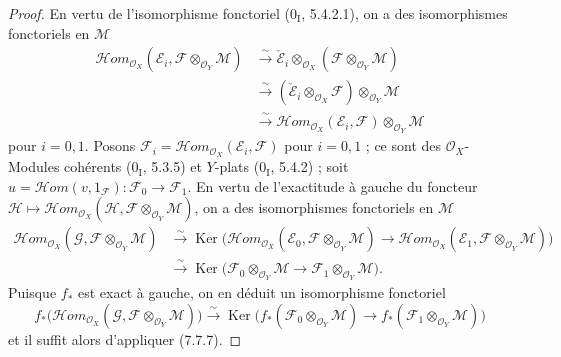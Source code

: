 \begin{proof}
En vertu de l'isomorphisme fonctoriel ($0_{\mathrm I}$, 5.4.2.1), on a des
isomorphismes fonctoriels en $\mathscr M$
\begin{align*}
  \mathscr{H}\!om_{\mathscr O_X}
    (\mathscr E_i,\mathscr F\otimes_{\mathscr O_Y}\mathscr M)
  &\xrightarrow{\sim}
  \check{\mathscr E}_i
    \otimes_{\mathscr O_X}
    (\mathscr F\otimes_{\mathscr O_Y}\mathscr M)\\
  &\xrightarrow{\sim}
  (\check{\mathscr E}_i\otimes_{\mathscr O_X}\mathscr F)
    \otimes_{\mathscr O_Y}\mathscr M\\
  &\xrightarrow{\sim}
  \mathscr{H}\!om_{\mathscr O_X}(\mathscr E_i,\mathscr F)
    \otimes_{\mathscr O_Y}\mathscr M
\end{align*}
pour $i=0,1$. Posons
$\mathscr F_i=\mathscr{H}\!om_{\mathscr O_X}(\mathscr E_i,\mathscr F)$ pour
$i=0,1$ ; ce sont des $\mathscr O_X$-Modules cohérents ($0_{\mathrm I}$, 5.3.5)
et $Y$-plats ($0_{\mathrm I}$, 5.4.2) ; soit
$u=\mathscr{H}\!om(v,1_{\mathscr F}):\mathscr F_0\to\mathscr F_1$. En vertu de
l'exactitude à gauche du foncteur
$\mathscr H\mapsto\mathscr{H}\!om_{\mathscr O_X}
(\mathscr H,\mathscr F\otimes_{\mathscr O_Y}\mathscr M)$, on a des isomorphismes
fonctoriels en $\mathscr M$
\begin{align*}
  \mathscr{H}\!om_{\mathscr O_X}
    (\mathscr G,\mathscr F\otimes_{\mathscr O_Y}\mathscr M)
  &\xrightarrow{\sim}
  \operatorname{Ker}
  \bigl(
    \mathscr{H}\!om_{\mathscr O_X}
      (\mathscr E_0,\mathscr F\otimes_{\mathscr O_Y}\mathscr M)
    \longrightarrow
    \mathscr{H}\!om_{\mathscr O_X}
      (\mathscr E_1,\mathscr F\otimes_{\mathscr O_Y}\mathscr M)
  \bigr)\\
  &\xrightarrow{\sim}
  \operatorname{Ker}
  \bigl(
    \mathscr F_0\otimes_{\mathscr O_Y}\mathscr M
    \longrightarrow
    \mathscr F_1\otimes_{\mathscr O_Y}\mathscr M
  \bigr).
\end{align*}
Puisque $f_*$ est exact à gauche, on en déduit un isomorphisme fonctoriel
\[
  f_*
  \bigl(
    \mathscr{H}\!om_{\mathscr O_X}
      (\mathscr G,\mathscr F\otimes_{\mathscr O_Y}\mathscr M)
  \bigr)
  \xrightarrow{\sim}
  \operatorname{Ker}
  \bigl(
    f_*(\mathscr F_0\otimes_{\mathscr O_Y}\mathscr M)
    \longrightarrow
    f_*(\mathscr F_1\otimes_{\mathscr O_Y}\mathscr M)
  \bigr)
\]
et il suffit alors d'appliquer (7.7.7).
\end{proof}

